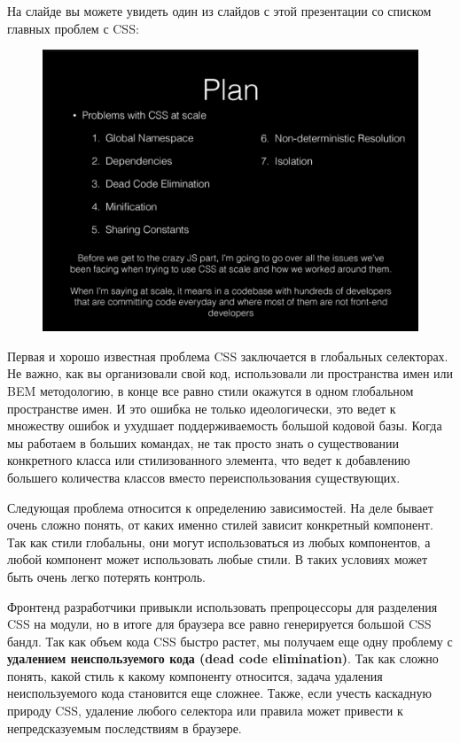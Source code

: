 На слайде вы можете увидеть один из слайдов с этой презентации со списком главных проблем с CSS:

\begin{figure}[hbt]
  \includegraphics[width=1.\textwidth]{images/css-problems-slide}
\end{figure}

Первая и хорошо известная проблема CSS заключается в глобальных селекторах. Не важно, как вы организовали свой код, использовали ли пространства имен или BEM методологию, в конце все равно стили окажутся в одном глобальном пространстве имен. И это ошибка не только идеологически, это ведет к множеству ошибок и ухудшает поддерживаемость большой кодовой базы. Когда мы работаем в больших командах, не так просто знать о существовании конкретного класса или стилизованного элемента, что ведет к добавлению большего количества классов вместо переиспользования существующих.

Следующая проблема относится к определению зависимостей. На деле бывает очень сложно понять, от каких именно стилей зависит конкретный компонент. Так как стили глобальны, они могут использоваться из любых компонентов, а любой компонент может использовать любые стили. В таких условиях может быть очень легко потерять контроль.

Фронтенд разработчики привыкли использовать препроцессоры для разделения CSS на модули, но в итоге для браузера все равно генерируется большой CSS бандл. Так как объем кода CSS быстро растет, мы получаем еще одну проблему с \textbf{удалением неиспользуемого кода (dead code elimination)}. Так как сложно понять, какой стиль к какому компоненту относится, задача удаления неиспользуемого кода становится еще сложнее. Также, если учесть каскадную природу CSS, удаление любого селектора или правила может привести к непредсказуемым последствиям в браузере.

